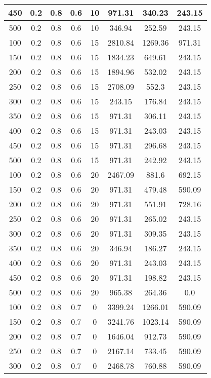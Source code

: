 \documentclass[a4paper, 12pt]{extreport}
\begin{document}
\begin{itemize}
\begin{longtable}{|c|c|c|c|c|c|c|c|}
			450 & 0.2 & 0.8 & 0.6 & 10 & 971.31 & 340.23 & 243.15 \\\hline
			500 & 0.2 & 0.8 & 0.6 & 10 & 346.94 & 252.59 & 243.15 \\\hline
			100 & 0.2 & 0.8 & 0.6 & 15 & 2810.84 & 1269.36 & 971.31 \\\hline
			150 & 0.2 & 0.8 & 0.6 & 15 & 1834.23 & 649.61 & 243.15 \\\hline
			200 & 0.2 & 0.8 & 0.6 & 15 & 1894.96 & 532.02 & 243.15 \\\hline
			250 & 0.2 & 0.8 & 0.6 & 15 & 2708.09 & 552.3 & 243.15 \\\hline
			300 & 0.2 & 0.8 & 0.6 & 15 & 243.15 & 176.84 & 243.15 \\\hline
			350 & 0.2 & 0.8 & 0.6 & 15 & 971.31 & 306.11 & 243.15 \\\hline
			400 & 0.2 & 0.8 & 0.6 & 15 & 971.31 & 243.03 & 243.15 \\\hline
			450 & 0.2 & 0.8 & 0.6 & 15 & 971.31 & 296.68 & 243.15 \\\hline
			500 & 0.2 & 0.8 & 0.6 & 15 & 971.31 & 242.92 & 243.15 \\\hline
			100 & 0.2 & 0.8 & 0.6 & 20 & 2467.09 & 881.6 & 692.15 \\\hline
			150 & 0.2 & 0.8 & 0.6 & 20 & 971.31 & 479.48 & 590.09 \\\hline
			200 & 0.2 & 0.8 & 0.6 & 20 & 971.31 & 551.91 & 728.16 \\\hline
			250 & 0.2 & 0.8 & 0.6 & 20 & 971.31 & 265.02 & 243.15 \\\hline
			300 & 0.2 & 0.8 & 0.6 & 20 & 971.31 & 309.35 & 243.15 \\\hline
			350 & 0.2 & 0.8 & 0.6 & 20 & 346.94 & 186.27 & 243.15 \\\hline
			400 & 0.2 & 0.8 & 0.6 & 20 & 971.31 & 243.03 & 243.15 \\\hline
			450 & 0.2 & 0.8 & 0.6 & 20 & 971.31 & 198.82 & 243.15 \\\hline
			500 & 0.2 & 0.8 & 0.6 & 20 & 965.38 & 264.36 & 0.0 \\\hline
			100 & 0.2 & 0.8 & 0.7 & 0 & 3399.24 & 1266.01 & 590.09 \\\hline
			150 & 0.2 & 0.8 & 0.7 & 0 & 3241.76 & 1023.14 & 590.09 \\\hline
			200 & 0.2 & 0.8 & 0.7 & 0 & 1646.04 & 912.73 & 590.09 \\\hline
			250 & 0.2 & 0.8 & 0.7 & 0 & 2167.14 & 733.45 & 590.09 \\\hline
			300 & 0.2 & 0.8 & 0.7 & 0 & 2468.78 & 760.88 & 590.09 \\\hline

\end{longtable}
\end{itemize}
\end{document}
